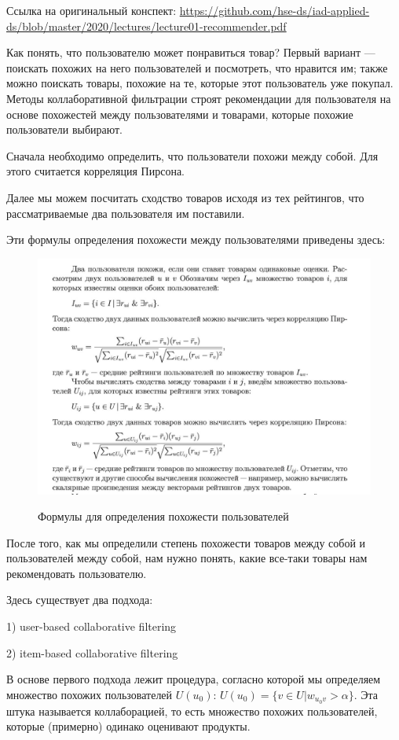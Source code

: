 Ссылка на оригинальный конспект: \url{https://github.com/hse-ds/iad-applied-ds/blob/master/2020/lectures/lecture01-recommender.pdf}
	
	Как понять, что пользователю может понравиться товар? Первый вариант — поискать похожих на него пользователей и посмотреть, что нравится им; также можно поискать товары, похожие на те, которые этот пользователь уже покупал. Методы коллаборативной фильтрации строят рекомендации для пользователя на основе похожестей между пользователями и товарами, которые похожие пользователи выбирают.
	
	Сначала необходимо определить, что пользователи похожи между собой. Для этого считается корреляция Пирсона. 
	
	Далее мы можем посчитать сходство товаров исходя из тех рейтингов, что рассматриваемые два пользователя им поставили. 
	
	Эти формулы определения похожести между пользователями приведены здесь:
	
\begin{figure}[H]
\centering
\includegraphics[width=0.7\linewidth]{16_memory1.jpg}
\label{fig:16_memory1} 
\caption{Формулы для определения похожести пользователей}
\end{figure}
	
	
	После того, как мы определили степень похожести товаров между собой и пользователей между собой, нам нужно понять, какие все-таки товары нам рекомендовать пользователю.
	
	Здесь существует два подхода:
	
	1) user-based collaborative filtering 
	
	2) item-based collaborative filtering 
	
	В основе первого подхода лежит процедура, согласно которой мы определяем множество похожих пользователей $U(u_0)$: $U(u_0) = \{v \in U | w_{u_0 v} > \alpha\}$. Эта штука называется коллаборацией, то есть множество похожих пользователей, которые (примерно) одинако оценивают продукты. 
	
